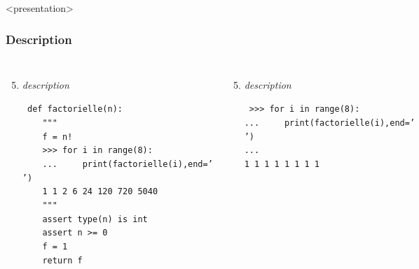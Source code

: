 \begin{frame}<presentation>
\frametitle{Description}
\begin{columns}[T]
\column{5.75cm}
\begin{enumerate}\setcounter{enumi}{4}
\item {\em description}
\begin{minipage}[t]{5.5cm}\scriptsize\tt
def factorielle(n):\\
\mbox{}\ \ \ \ {"""}\\
\mbox{}\ \ \ \ \alert{f = n!}\\
\mbox{}\ \ \ \ {>>> for i in range(8):}\\
\mbox{}\ \ \ \ {...\ \ \ \ \ print(factorielle(i),end=' ')}\\
\mbox{}\ \ \ \ {1 1 2 6 24 120 720 5040}\\
\mbox{}\ \ \ \ {"""}\\
\mbox{}\ \ \ \ assert type(n) is int\\
\mbox{}\ \ \ \ assert n >= 0\\
\mbox{}\ \ \ \ f = 1\\
\mbox{}\ \ \ \ return f
\end{minipage}
\end{enumerate}

\column{5.75cm}
\begin{enumerate}\setcounter{enumi}{4}
\item {\em description}
\begin{minipage}[t]{5cm}\scriptsize\tt
>>> for i in range(8):\\
...\ \ \ \ \ print(factorielle(i),end=' ')\\
...\\
1 1 1 1 1 1 1 1
\end{minipage}
\end{enumerate} 

\end{columns}
\pause

\end{frame}
